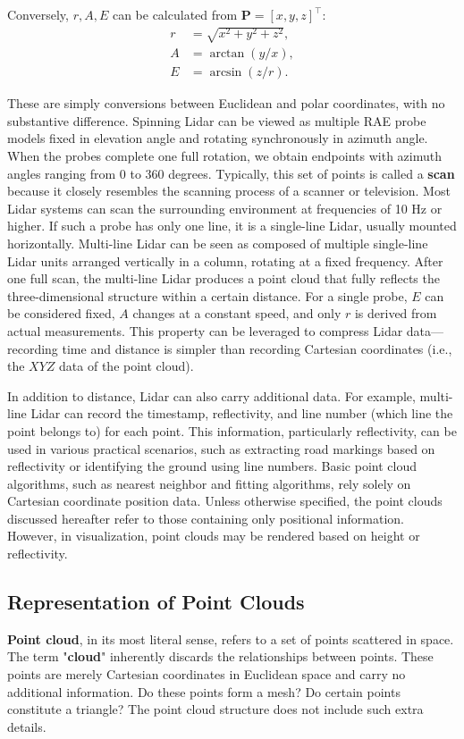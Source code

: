 Conversely, $r, A, E$ can be calculated from $\bm{P}=[x,y,z]^\top$:  
\begin{equation}\label{key}  
	\begin{aligned}  
		r &= \sqrt{x^2 + y^2 + z^2}, \\  
		A &= \arctan(y/x), \\  
		E &= \arcsin(z/r).  
	\end{aligned}  
\end{equation}  

These are simply conversions between Euclidean and polar coordinates, with no substantive difference. Spinning Lidar can be viewed as multiple RAE probe models fixed in elevation angle and rotating synchronously in azimuth angle.  
When the probes complete one full rotation, we obtain endpoints with azimuth angles ranging from 0 to 360 degrees. Typically, this set of points is called a \textbf{scan} because it closely resembles the scanning process of a scanner or television. Most Lidar systems can scan the surrounding environment at frequencies of 10 Hz or higher. If such a probe has only one line, it is a single-line Lidar, usually mounted horizontally. Multi-line Lidar can be seen as composed of multiple single-line Lidar units arranged vertically in a column, rotating at a fixed frequency. After one full scan, the multi-line Lidar produces a point cloud that fully reflects the three-dimensional structure within a certain distance. For a single probe, $E$ can be considered fixed, $A$ changes at a constant speed, and only $r$ is derived from actual measurements. This property can be leveraged to compress Lidar data—recording time and distance is simpler than recording Cartesian coordinates (i.e., the $XYZ$ data of the point cloud).  

In addition to distance, Lidar can also carry additional data. For example, multi-line Lidar can record the timestamp, reflectivity, and line number (which line the point belongs to) for each point. This information, particularly reflectivity, can be used in various practical scenarios, such as extracting road markings based on reflectivity or identifying the ground using line numbers. Basic point cloud algorithms, such as nearest neighbor and fitting algorithms, rely solely on Cartesian coordinate position data. Unless otherwise specified, the point clouds discussed hereafter refer to those containing only positional information. However, in visualization, point clouds may be rendered based on height or reflectivity.

\subsection{Representation of Point Clouds}  
\textbf{Point cloud}, in its most literal sense, refers to a set of points scattered in space. The term "\textbf{cloud}" inherently discards the relationships between points. These points are merely Cartesian coordinates in Euclidean space and carry no additional information. Do these points form a mesh? Do certain points constitute a triangle? The point cloud structure does not include such extra details.  

